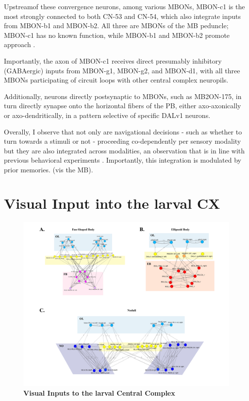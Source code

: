     Upstreamof these convergence neurons, among various MBONs, MBON-c1 is the most strongly connected to both CN-53 and CN-54, which also integrate inputs from MBON-b1 and MBON-b2. All three are MBONs of the MB peduncle; MBON-c1 has no known function, while MBON-b1 and MBON-b2 promote approach \citep{eschbach2021circuits}.

   Importantly, the axon of MBON-c1 receives direct presumably inhibitory (GABAergic) inputs from MBON-g1, MBON-g2, and MBON-d1, with all three MBONs participating of circuit loops with other central complex neuropils.

    Additionally, neurons directly postsynaptic to MBONs, such as MB2ON-175, in turn directly synapse onto the horizontal fibers of the PB, either axo-axonically or axo-dendritically, in a pattern selective of specific DALv1 neurons.

    Overally, I observe that not only are navigational decisions - such as whether to turn towards a stimuli or not - proceeding co-dependently per sensory modality but they are also integrated across modalities, an observation that is in line with previous behavioral experiments \citep{gepner2015computations}. Importantly, this integration is modulated by prior memories. (vis the MB). 





\section{Visual Input into the larval CX}
\label{CXvisual}
    \begin{figure}
        \centering
        \includegraphics[width=12cm]{Figs/CX/VisualtoCX.pdf}
        \caption[Visual Inputs to larval Central Complex Neuropils]{\textbf{Visual Inputs to the larval Central Complex}}
        \label{visualCXneuropils}
    \end{figure}

